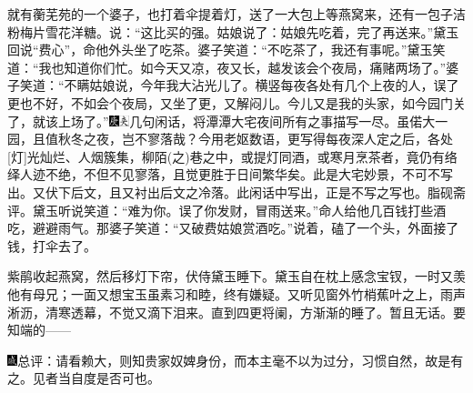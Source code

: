 就有蘅芜苑的一个婆子，也打着伞提着灯，送了一大包上等燕窝来，还有一包子洁粉梅片雪花洋糖。说：``这比买的强。姑娘说了：姑娘先吃着，完了再送来。''黛玉回说``费心''，命他外头坐了吃茶。婆子笑道：``不吃茶了，我还有事呢。''黛玉笑道：``我也知道你们忙。如今天又凉，夜又长，越发该会个夜局，痛赌两场了。''婆子笑道：``不瞒姑娘说，今年我大沾光儿了。横竖每夜各处有几个上夜的人，误了更也不好，不如会个夜局，又坐了更，又解闷儿。今儿又是我的头家，如今园门关了，就该上场了。''{\includegraphics[width=3mm]{../Images/00004}\includegraphics[width=3mm]{../Images/00012}\footnotesize \kaishu 几句闲话，将潭潭大宅夜间所有之事描写一尽。虽偌大一园，且值秋冬之夜，岂不寥落哉？今用老妪数语，更写得每夜深人定之后，各处{[}灯{]}光灿烂、人烟簇集，柳陌{(之)}巷之中，或提灯同酒，或寒月烹茶者，竟仍有络绎人迹不绝，不但不见寥落，且觉更胜于日间繁华矣。此是大宅妙景，不可不写出。又伏下后文，且又衬出后文之冷落。此闲话中写出，正是不写之写也。脂砚斋评。}黛玉听说笑道：``难为你。误了你发财，冒雨送来。''命人给他几百钱打些酒吃，避避雨气。那婆子笑道：``又破费姑娘赏酒吃。''说着，磕了一个头，外面接了钱，打伞去了。

紫鹃收起燕窝，然后移灯下帘，伏侍黛玉睡下。黛玉自在枕上感念宝钗，一时又羡他有母兄；一面又想宝玉虽素习和睦，终有嫌疑。又听见窗外竹梢蕉叶之上，雨声淅沥，清寒透幕，不觉又滴下泪来。直到四更将阑，方渐渐的睡了。暂且无话。要知端的------

{\includegraphics[width=3mm]{../Images/00005}总评：请看赖大，则知贵家奴婢身份，而本主毫不以为过分，习惯自然，故是有之。见者当自度是否可也。}

